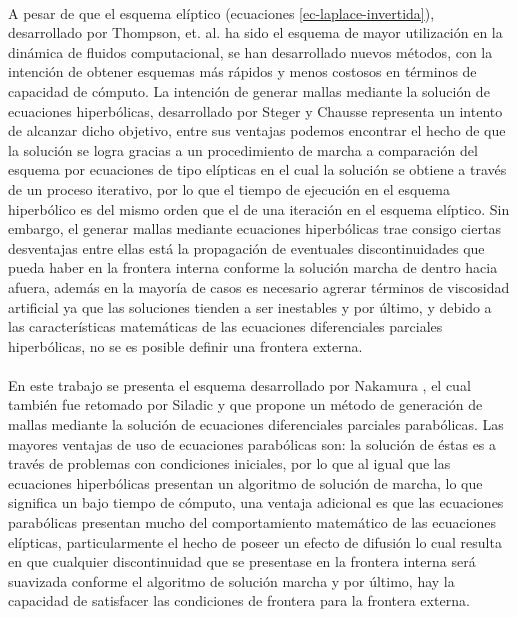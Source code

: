 \documentclass[letterpaper, openright, 12pt]{book}
\begin{document}
		\paragraph*{}
			A pesar de que el esquema elíptico (ecuaciones \ref{ec-laplace-invertida}), desarrollado por Thompson, et. al. \cite{thompson1974automatic} ha sido el esquema de mayor utilización en la dinámica de fluidos computacional, se han desarrollado nuevos métodos, con la intención de obtener esquemas más rápidos y menos costosos en términos de capacidad de cómputo. La intención de generar mallas mediante la solución de ecuaciones hiperbólicas, desarrollado por Steger y Chausse \cite{Hyperbolic-steger1980generation} representa un intento de alcanzar dicho objetivo, entre sus ventajas podemos encontrar el hecho de que la solución se logra gracias a un procedimiento de marcha a comparación del esquema por ecuaciones de tipo elípticas en el cual la solución se obtiene a través de un proceso iterativo, por lo que el tiempo de ejecución en el esquema hiperbólico es del mismo orden que el de una iteración en el esquema elíptico. Sin embargo, el generar mallas mediante ecuaciones hiperbólicas trae consigo ciertas desventajas entre ellas está la propagación de eventuales discontinuidades que pueda haber en la frontera interna conforme la solución marcha de dentro hacia afuera, además en la mayoría de casos es necesario agrerar términos de viscosidad artificial ya que las soluciones tienden a ser inestables y por último, y debido a las características matemáticas de las ecuaciones diferenciales parciales hiperbólicas, no se es posible definir una frontera externa.
		
		\paragraph*{}
			En este trabajo se presenta el esquema desarrollado por Nakamura \cite{nakamuraParabolic}, el cual también fue retomado por Siladic \cite{siladicParabolic} y que propone un método de generación de mallas mediante la solución de ecuaciones diferenciales parciales parabólicas. Las mayores ventajas de uso de ecuaciones parabólicas son: la solución de éstas es a través de problemas con condiciones iniciales, por lo que al igual que las ecuaciones hiperbólicas presentan un algoritmo de solución de marcha, lo que significa un bajo tiempo de cómputo, una ventaja adicional es que las ecuaciones parabólicas presentan mucho del comportamiento matemático de las ecuaciones elípticas, particularmente el hecho de poseer un efecto de difusión lo cual resulta en que cualquier discontinuidad que se presentase en la frontera interna será suavizada conforme el algoritmo de solución marcha y por último, hay la capacidad de satisfacer las condiciones de frontera para la frontera externa.
		
\end{document}
